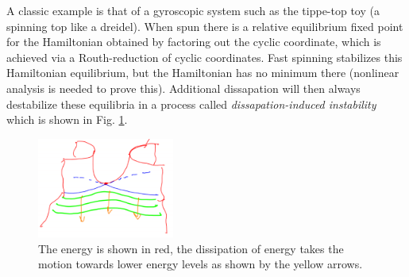 \begin{ex}
	A classic example is that of a gyroscopic system such as the tippe-top toy (a spinning top like a dreidel). When spun there is a relative equilibrium fixed point for the Hamiltonian obtained by factoring out the cyclic coordinate, which is achieved via a Routh-reduction of cyclic coordinates. Fast spinning stabilizes this Hamiltonian equilibrium, but the Hamiltonian has no minimum there (nonlinear analysis is needed to prove this). Additional dissapation will then always destabilize these equilibria in a process called \emph{dissapation-induced instability} which is shown in Fig. \ref{fig:dissapation_instability}.
	\begin{figure}[h!]
		\centering
		\includegraphics[width=0.4\textwidth]{figures/ch8/19dissapation_instability.png}
		\caption{The energy is shown in red, the dissipation of energy takes the motion towards lower energy levels as shown by the yellow arrows.}
		\label{fig:dissapation_instability}
	\end{figure}
\end{ex}

